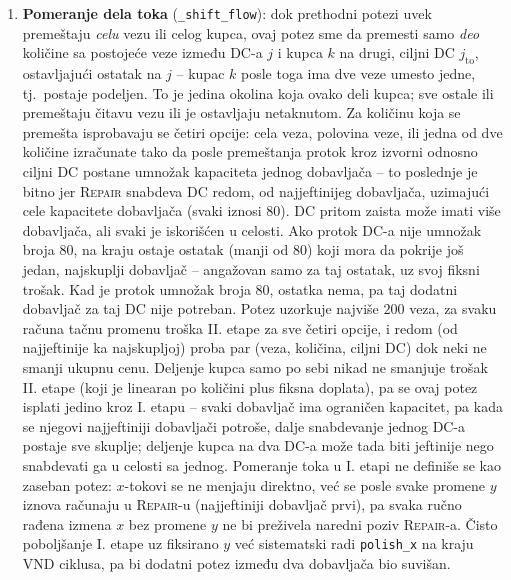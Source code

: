 \documentclass[12pt,a4paper]{article}
\begin{document}
\begin{enumerate}
    na najjeftiniji od preostalih otvorenih DC-ova (videti i
    odeljak~\ref{sec:egzaktno-filtriranje}).
  \item \textbf{Pomeranje dela toka} (\texttt{\_shift\_flow}): dok prethodni
    potezi uvek premeštaju \emph{celu} vezu ili celog kupca, ovaj potez sme da
    premesti samo \emph{deo} količine sa postojeće veze između DC-a $j$ i
    kupca $k$ na drugi, ciljni DC $j_{\text{to}}$, ostavljajući ostatak na
    $j$ -- kupac $k$ posle toga ima dve veze umesto jedne, tj.\ postaje
    podeljen. To je jedina okolina koja
    ovako deli kupca; sve ostale ili premeštaju čitavu vezu ili je ostavljaju
    netaknutom. Za količinu koja se premešta isprobavaju se četiri opcije:
    cela veza, polovina veze, ili jedna od dve količine izračunate tako da
    posle premeštanja protok kroz izvorni odnosno ciljni DC postane
    umnožak kapaciteta jednog dobavljača -- to poslednje je bitno jer
    \textsc{Repair} snabdeva DC redom, od najjeftinijeg dobavljača, uzimajući
    cele kapacitete dobavljača (svaki iznosi 80). DC pritom zaista može imati
    više dobavljača, ali svaki je iskorišćen u celosti. Ako protok DC-a nije
    umnožak broja 80, na kraju ostaje ostatak (manji od 80) koji mora da
    pokrije još jedan, najskuplji dobavljač -- angažovan samo za taj ostatak,
    uz svoj fiksni trošak. Kad je protok umnožak broja 80, ostatka nema, pa
    taj dodatni dobavljač za taj DC nije potreban. Potez uzorkuje najviše $200$ veza,
    za svaku računa tačnu promenu troška II. etape za sve četiri opcije, i
    redom (od najjeftinije ka najskupljoj) proba par (veza, količina, ciljni
    DC) dok neki ne smanji ukupnu cenu. Deljenje kupca samo po sebi nikad ne
    smanjuje trošak II. etape (koji je linearan po količini plus fiksna
    doplata), pa se ovaj potez isplati jedino kroz I. etapu -- svaki
    dobavljač ima ograničen kapacitet, pa kada se njegovi najjeftiniji
    dobavljači potroše, dalje snabdevanje jednog DC-a postaje sve skuplje;
    deljenje kupca na dva DC-a može tada biti jeftinije nego snabdevati ga
    u celosti sa jednog. Pomeranje toka u I. etapi ne definiše se kao zaseban
    potez: $x$-tokovi se ne menjaju direktno, već se posle svake promene $y$
    iznova računaju u \textsc{Repair}-u (najjeftiniji dobavljač prvi), pa svaka
    ručno rađena izmena $x$ bez promene $y$ ne bi preživela naredni poziv
    \textsc{Repair}-a. Čisto poboljšanje I. etape uz fiksirano $y$ već
    sistematski radi \texttt{polish\_x} na kraju VND ciklusa, pa bi dodatni
    potez između dva dobavljača bio suvišan.
\end{enumerate}
\end{document}
